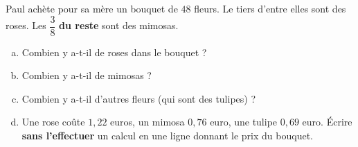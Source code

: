 Paul achète pour sa mère un bouquet de $48$ fleurs. Le tiers
d'entre elles sont des roses. Les $\dfrac38$ \textbf{du reste}
sont des mimosas.
\begin{enumerate}[(a)]
    \item Combien y a-t-il de roses dans le bouquet ?
    \item Combien y a-t-il de mimosas ?
    \item Combien y a-t-il d'autres fleurs (qui sont des tulipes) ?
    \item Une rose coûte $1,22$ euros, un mimosa $0,76$ euro, une tulipe $0,69$
    euro. \'Ecrire \textbf{sans l'effectuer} un calcul en une ligne donnant le prix du bouquet.
\end{enumerate}